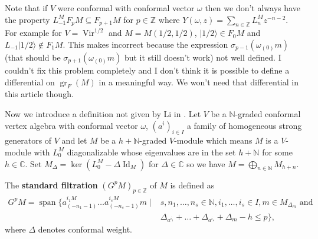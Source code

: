 \documentclass[12pt, a4paper]{article}
\DeclareMathOperator{\Vir}{Vir}
\DeclareMathOperator{\Id}{Id}
\DeclareMathOperator{\gr}{gr}
\DeclareMathOperator{\vspan}{span}
\newcommand{\vachalf}{|1/2\rangle}
\begin{document}
Note that if $V$ were conformal with conformal vector $\omega$ then we don't always have the property $L_{-1}^MF_pM \subseteq F_{p + 1}M$ for $p \in \mathbb{Z}$ where $Y(\omega, z)=\sum_{n \in \mathbb{Z}}L^M_nz^{-n - 2}$.
For example for $V = \Vir^{1/2}$ and $M = M(1/2, 1/2)$, $\vachalf \in F_0M$ and $L_{-1}\vachalf \notin F_1M$.
This makes \cite[Lemma 3.1.2]{arakawa_remark_2012} incorrect because the expression $\sigma_{p - 1}(\omega_{(0)}m)$ (that should be $\sigma_{p + 1}(\omega_{(0)}m)$ but it still doesn't work) not well defined.
I couldn't fix this problem completely and I don't think it is possible to define a differential on $\gr_F(M)$ in a meaningful way.
We won't need that differential in this article though.

Now we introduce a definition not given by Li in \cite{li_vertex_2004}.
Let $V$ be a $\mathbb{N}$-graded conformal vertex algebra with conformal vector $\omega$, $(a^i)_{i\in I}$ a family of homogeneous strong generators of $V$ and let $M$ be a $h+\mathbb{N}$-graded $V$-module which means $M$ is a $V$-module with $L_0^M$ diagonalizable whose eigenvalues are in the set $h + \mathbb{N}$ for some $h \in \mathbb{C}$.
Set $M_\Delta = \ker(L^M_0 - \Delta\Id_M)$ for $\Delta \in \mathbb{C}$ so we have $M = \bigoplus_{n \in \mathbb{N}}M_{h + n}$.

The \textbf{standard filtration} $(G^pM)_{p \in \mathbb{Z}}$ of $M$ is defined as
\begin{equation*}
  \begin{split}
    G^pM = \vspan\{a^{i_1M}_{(-n_1 - 1)}\dots a^{i_sM}_{(-n_s - 1)}m \mid& s, n_1, \dots, n_s \in \mathbb{N}, i_1, \dots, i_s \in I, m \in M_{\Delta_m} \text{ and }\\
    &\Delta_{a^{i_1}} + \dots + \Delta_{a^{i_s}} + \Delta_m - h \le p\},
  \end{split}
\end{equation*}
where $\Delta$ denotes conformal weight.
\end{document}
